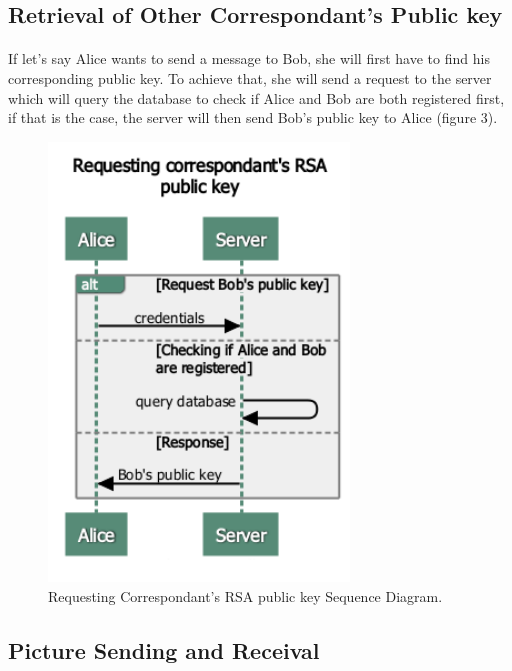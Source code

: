 	  \subsection{Retrieval of Other Correspondant's Public key}
	  \paragraph{}
	  
	    If let's say Alice wants to send a message to Bob, she will first have to find his corresponding public key. To achieve that, she will send a request to the server which will query the database to check if Alice and Bob are both registered first, if that is the case, the server will then send Bob's public key to Alice (figure 3).
	    
	    \begin{figure}[H]
	      \centering
	      \includegraphics[width=8cm]{images/architecture/requestingcorrespondant'sRSApublickey}
	      \caption{Requesting Correspondant's RSA public key Sequence Diagram.}
	    \end{figure}
	    
	    
	    \subsection{Picture Sending and Receival}
	    \paragraph{}
	    
